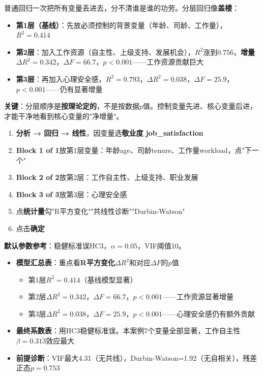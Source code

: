 \begin{algoprinciple}
普通回归一次把所有变量丢进去，分不清谁是谁的功劳。分层回归像\textbf{盖楼}：
\begin{itemize}
    \item \textbf{第1层（基线）}：先放必须控制的背景变量（年龄、司龄、工作量），$R^2=0.414$
    \item \textbf{第2层}：加入工作资源（自主性、上级支持、发展机会），$R^2$涨到0.756，\textbf{增量}$\Delta R^2=0.342$，$\Delta F=66.7$，$p<0.001$——工作资源贡献巨大
    \item \textbf{第3层}：再加入心理安全感，$R^2=0.793$，$\Delta R^2=0.038$，$\Delta F=25.9$，$p<0.001$——仍有显著增量
\end{itemize}

\textbf{关键}：分层顺序是\textbf{按理论定的}，不是按数据$p$值。控制变量先进、核心变量后进，才能干净地看到核心变量的"净增量"。
\end{algoprinciple}

\begin{algosposs}
\begin{enumerate}
    \item \textbf{分析 → 回归 → 线性}，因变量选\textbf{敬业度 job\_satisfaction}
    \item \textbf{Block 1 of 1}放第1层变量：年龄age、司龄tenure、工作量workload，点"下一个"
    \item \textbf{Block 2 of 2}放第2层：工作自主性、上级支持、职业发展
    \item \textbf{Block 3 of 3}放第3层：心理安全感
    \item 点\textbf{统计量}勾"R平方变化""共线性诊断""Durbin-Watson"
    \item 点击\textbf{确定}
\end{enumerate}

\textbf{默认参数参考}：稳健标准误HC3，$\alpha=0.05$，VIF阈值10。
\end{algosposs}

\begin{algoresult}
\begin{itemize}
    \item \textbf{模型汇总表}：重点看\textbf{R平方变化$\Delta R^2$}和对应$\Delta F$的$p$值
    \begin{itemize}
        \item 第1层$R^2=0.414$（基线模型显著）
        \item 第2层$\Delta R^2=0.342$，$\Delta F=66.7$，$p<0.001$——工作资源显著增量
        \item 第3层$\Delta R^2=0.038$，$\Delta F=25.9$，$p<0.001$——心理安全感仍有额外贡献
    \end{itemize}
    \item \textbf{最终系数表}：用HC3稳健标准误。本案例7个变量全部显著，工作自主性$\beta=0.313$效应最大
    \item \textbf{前提诊断}：VIF最大4.31（无共线），Durbin-Watson=1.92（无自相关），残差正态$p=0.753$
\end{itemize}
\end{algoresult}

